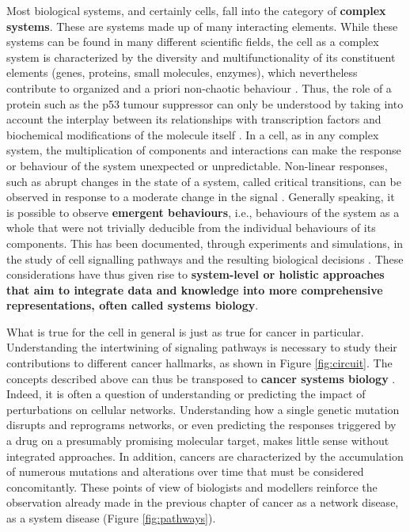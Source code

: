 \documentclass[a4paper,12pt,twoside,onecolumn,openright,final,oldfontcommands]{memoir}
\begin{document}
Most biological systems, and certainly cells, fall into the category of
\textbf{complex systems}. These are systems made up of many interacting
elements. While these systems can be found in many different scientific
fields, the cell as a complex system is characterized by the diversity
and multifunctionality of its constituent elements (genes, proteins,
small molecules, enzymes), which nevertheless contribute to organized
and a priori non-chaotic behaviour \citep{kitano2002computational}.
Thus, the role of a protein such as the p53 tumour suppressor can only
be understood by taking into account the interplay between its
relationships with transcription factors and biochemical modifications
of the molecule itself \citep{kitano2002computational}. In a cell, as in
any complex system, the multiplication of components and interactions
can make the response or behaviour of the system unexpected or
unpredictable. Non-linear responses, such as abrupt changes in the state
of a system, called critical transitions, can be observed in response to
a moderate change in the signal \citep{trefois2015critical}. Generally
speaking, it is possible to observe \textbf{emergent behaviours}, i.e.,
behaviours of the system as a whole that were not trivially deducible
from the individual behaviours of its components. This has been
documented, through experiments and simulations, in the study of cell
signalling pathways and the resulting biological decisions
\citep{bhalla1999emergent, helikar2008emergent}. These considerations
have thus given rise to \textbf{system-level or holistic approaches that
aim to integrate data and knowledge into more comprehensive
representations, often called systems biology}.

What is true for the cell in general is just as true for cancer in
particular. Understanding the intertwining of signaling pathways is
necessary to study their contributions to different cancer hallmarks, as
shown in Figure \ref{fig:circuit}. The concepts described above can thus
be transposed to \textbf{cancer systems biology}
\citep{hornberg2006cancer, kreeger2010cancer, barillot2012computational}.
Indeed, it is often a question of understanding or predicting the impact
of perturbations on cellular networks. Understanding how a single
genetic mutation disrupts and reprograms networks, or even predicting
the responses triggered by a drug on a presumably promising molecular
target, makes little sense without integrated approaches. In addition,
cancers are characterized by the accumulation of numerous mutations and
alterations over time that must be considered concomitantly. These
points of view of biologists and modellers reinforce the observation
already made in the previous chapter of cancer as a network disease, as
a system disease (Figure \ref{fig:pathways}).
\end{document}
